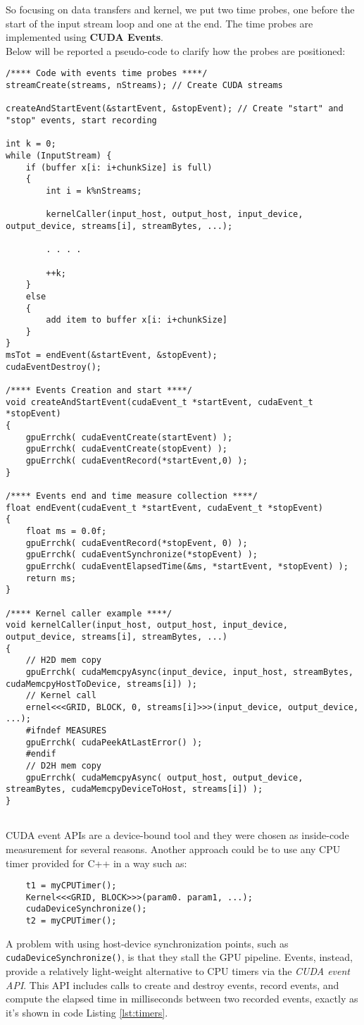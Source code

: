 So focusing on data transfers and kernel, we put two time probes, one before the start of the input stream loop and one at the end. The time probes are implemented using \textbf{CUDA Events}.\\
Below will be reported a pseudo-code to clarify how the probes are positioned:
\begin{lstlisting}[label={lst:timers}]	
/**** Code with events time probes ****/	
streamCreate(streams, nStreams); // Create CUDA streams

createAndStartEvent(&startEvent, &stopEvent); // Create "start" and "stop" events, start recording

int k = 0;
while (InputStream) {  
	if (buffer x[i: i+chunkSize] is full)
	{
		int i = k%nStreams;
		
		kernelCaller(input_host, output_host, input_device, output_device, streams[i], streamBytes, ...);

		. . . .
		
		++k;
	}
	else
	{
		add item to buffer x[i: i+chunkSize]
	}	
} 
msTot = endEvent(&startEvent, &stopEvent);
cudaEventDestroy();
		
/**** Events Creation and start ****/
void createAndStartEvent(cudaEvent_t *startEvent, cudaEvent_t *stopEvent)
{
	gpuErrchk( cudaEventCreate(startEvent) );
	gpuErrchk( cudaEventCreate(stopEvent) );
	gpuErrchk( cudaEventRecord(*startEvent,0) );
}

/**** Events end and time measure collection ****/
float endEvent(cudaEvent_t *startEvent, cudaEvent_t *stopEvent)
{
	float ms = 0.0f;
	gpuErrchk( cudaEventRecord(*stopEvent, 0) );
	gpuErrchk( cudaEventSynchronize(*stopEvent) );
	gpuErrchk( cudaEventElapsedTime(&ms, *startEvent, *stopEvent) );
	return ms;
}
	
/**** Kernel caller example ****/
void kernelCaller(input_host, output_host, input_device, output_device, streams[i], streamBytes, ...)
{
	// H2D mem copy 
	gpuErrchk( cudaMemcpyAsync(input_device, input_host, streamBytes, cudaMemcpyHostToDevice, streams[i]) ); 
	// Kernel call
	ernel<<<GRID, BLOCK, 0, streams[i]>>>(input_device, output_device, ...); 
	#ifndef MEASURES
	gpuErrchk( cudaPeekAtLastError() );
	#endif   
	// D2H mem copy 
	gpuErrchk( cudaMemcpyAsync( output_host, output_device, streamBytes, cudaMemcpyDeviceToHost, streams[i]) );
}
	
\end{lstlisting}
CUDA event APIs are a device-bound tool and they were chosen as inside-code measurement for several reasons.
Another approach could be to use any CPU timer provided for C++ in a way such as:
\begin{lstlisting}
	t1 = myCPUTimer();
	Kernel<<<GRID, BLOCK>>>(param0. param1, ...);
	cudaDeviceSynchronize();
	t2 = myCPUTimer();
\end{lstlisting}
A problem with using host-device synchronization points, such as \texttt{cudaDeviceSynchronize()}, is that they stall the GPU pipeline.
Events, instead, provide a relatively light-weight alternative to CPU timers via the \textit{CUDA event API}. This API includes calls to create and destroy events, record events, and compute the elapsed time in milliseconds between two recorded events, exactly as it's shown in code Listing \ref{lst:timers}.

